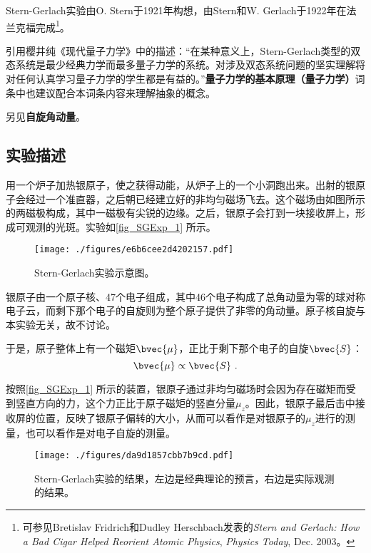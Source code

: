 


Stern-Gerlach实验由O. Stern于1921年构想，由Stern和W. Gerlach于1922年在法兰克福完成\footnote{可参见Bretislav Fridrich和Dudley Herschbach发表的\textsl{Stern and Gerlach: How a Bad Cigar Helped Reorient Atomic Physics}, \textsl{Physics Today}, Dec. 2003。}。

引用樱井纯《现代量子力学》中的描述：“在某种意义上，Stern-Gerlach类型的双态系统是最少经典力学而最多量子力学的系统。对涉及双态系统问题的坚实理解将对任何认真学习量子力学的学生都是有益的。”\textbf{量子力学的基本原理（量子力学）}词条中也建议配合本词条内容来理解抽象的概念。

另见\textbf{自旋角动量}。


\subsection{实验描述}

用一个炉子加热银原子，使之获得动能，从炉子上的一个小洞跑出来。出射的银原子会经过一个准直器，之后朝已经建立好的非均匀磁场飞去。这个磁场由如图所示的两磁极构成，其中一磁极有尖锐的边缘。之后，银原子会打到一块接收屏上，形成可观测的光斑。实验如\autoref{fig_SGExp_1} 所示。


\begin{figure}[ht]
\centering
\texttt{[image: ./figures/e6b6cee2d4202157.pdf]}
\caption{Stern-Gerlach实验示意图。} \label{fig_SGExp_1}
\end{figure}

银原子由一个原子核、47个电子组成，其中46个电子构成了总角动量为零的球对称电子云，而剩下那个电子的自旋则为整个原子提供了非零的角动量。原子核自旋与本实验无关，故不讨论。

于是，原子整体上有一个磁矩$\bvec{\mu}$，正比于剩下那个电子的自旋$\bvec{S}$：
\begin{equation}
\bvec{\mu}\propto\bvec{S}~.
\end{equation}

按照\autoref{fig_SGExp_1} 所示的装置，银原子通过非均匀磁场时会因为存在磁矩而受到竖直方向的力，这个力正比于原子磁矩的竖直分量$\mu_z$。因此，银原子最后击中接收屏的位置，反映了银原子偏转的大小，从而可以看作是对银原子的$\mu_z$进行的测量，也可以看作是对电子自旋的测量。




\begin{figure}[ht]
\centering
\texttt{[image: ./figures/da9d1857cbb7b9cd.pdf]}
\caption{Stern-Gerlach实验的结果，左边是经典理论的预言，右边是实际观测的结果。} \label{fig_SGExp_2}
\end{figure}

